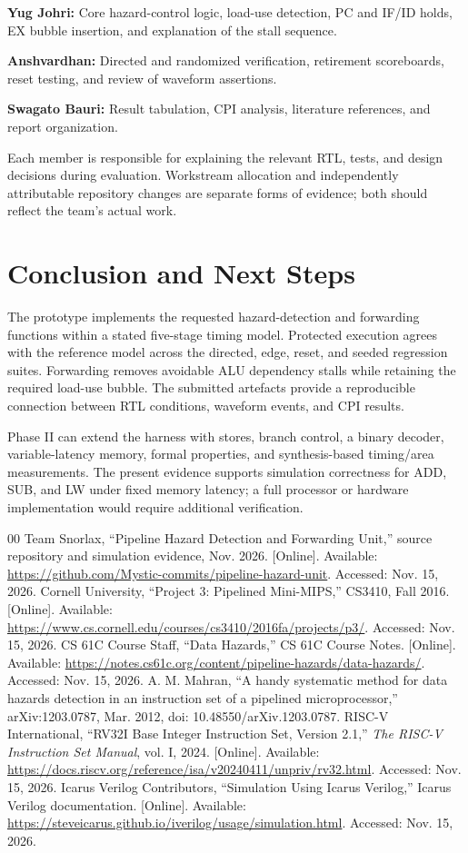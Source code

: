 \documentclass[conference]{IEEEtran}
\begin{document}
\textbf{Yug Johri:} Core hazard-control logic, load-use detection, PC and IF/ID holds, EX bubble insertion, and explanation of the stall sequence.

\textbf{Anshvardhan:} Directed and randomized verification, retirement scoreboards, reset testing, and review of waveform assertions.

\textbf{Swagato Bauri:} Result tabulation, CPI analysis, literature references, and report organization.

Each member is responsible for explaining the relevant RTL, tests, and design decisions during evaluation. Workstream allocation and independently attributable repository changes are separate forms of evidence; both should reflect the team's actual work.

\section{Conclusion and Next Steps}
The prototype implements the requested hazard-detection and forwarding functions within a stated five-stage timing model. Protected execution agrees with the reference model across the directed, edge, reset, and seeded regression suites. Forwarding removes avoidable ALU dependency stalls while retaining the required load-use bubble. The submitted artefacts provide a reproducible connection between RTL conditions, waveform events, and CPI results.

Phase II can extend the harness with stores, branch control, a binary decoder, variable-latency memory, formal properties, and synthesis-based timing/area measurements. The present evidence supports simulation correctness for ADD, SUB, and LW under fixed memory latency; a full processor or hardware implementation would require additional verification.

\begin{thebibliography}{00}
 Team Snorlax, ``Pipeline Hazard Detection and Forwarding Unit,'' source repository and simulation evidence, Nov. 2026. [Online]. Available: \url{https://github.com/Mystic-commits/pipeline-hazard-unit}. Accessed: Nov. 15, 2026.
 Cornell University, ``Project 3: Pipelined Mini-MIPS,'' CS3410, Fall 2016. [Online]. Available: \url{https://www.cs.cornell.edu/courses/cs3410/2016fa/projects/p3/}. Accessed: Nov. 15, 2026.
 CS 61C Course Staff, ``Data Hazards,'' CS 61C Course Notes. [Online]. Available: \url{https://notes.cs61c.org/content/pipeline-hazards/data-hazards/}. Accessed: Nov. 15, 2026.
 A. M. Mahran, ``A handy systematic method for data hazards detection in an instruction set of a pipelined microprocessor,'' arXiv:1203.0787, Mar. 2012, doi: 10.48550/arXiv.1203.0787.
 RISC-V International, ``RV32I Base Integer Instruction Set, Version 2.1,'' \emph{The RISC-V Instruction Set Manual}, vol. I, 2024. [Online]. Available: \url{https://docs.riscv.org/reference/isa/v20240411/unpriv/rv32.html}. Accessed: Nov. 15, 2026.
 Icarus Verilog Contributors, ``Simulation Using Icarus Verilog,'' Icarus Verilog documentation. [Online]. Available: \url{https://steveicarus.github.io/iverilog/usage/simulation.html}. Accessed: Nov. 15, 2026.
\end{thebibliography}
\end{document}
